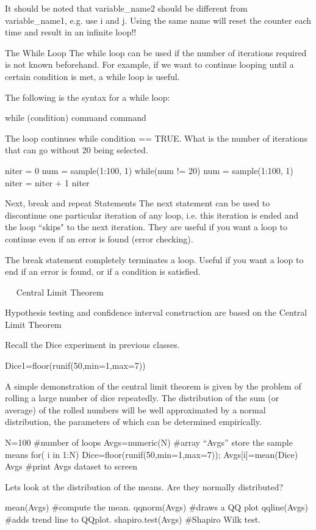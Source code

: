 It should be noted that variable_name2 should be different from
variable_name1, e.g. use i and j. Using the same name will
reset the counter each time and result in an infinite loop!!





The While Loop
The while loop can be used if the number of iterations required is not known beforehand. For example, if we want to continue looping until a certain condition is met, a while loop is useful.

The following is the syntax for a while loop:

while (condition){
command
command
}

The loop continues while condition == TRUE.
What is the number of iterations that can go without 20 being selected.

niter = 0		
num = sample(1:100, 1)
while(num != 20) 
   {
    num = sample(1:100, 1)
    niter = niter + 1
   }
niter

Next, break and repeat Statements
The next statement can be used to discontinue one particular iteration of any loop, i.e. this iteration is ended and the loop “skips" to the next iteration. They are useful if you want a loop to continue even if an error is found (error checking).

The break statement completely terminates a loop. Useful if you want a loop to end if an error is found, or if a condition is satisfied.




 
Central Limit Theorem

Hypothesis testing and confidence interval construction are based on the Central Limit Theorem

Recall the Dice experiment in previous classes.

Dice1=floor(runif(50,min=1,max=7))  

A simple demonstration of the central limit theorem is given by the problem of rolling a large number of dice repeatedly. 
The distribution of the sum (or average) of the rolled numbers will be well approximated by a normal distribution, the parameters of which can be determined empirically.
 
N=100            #number of loops
Avgs=numeric(N)  #array “Avgs” store the sample means
for( i in 1:N)
     { 
     Dice=floor(runif(50,min=1,max=7));
     Avgs[i]=mean(Dice)  
}                                 
Avgs            #print Avgs dataset to screen

Lets look at the distribution of the means. Are they normally distributed?

mean(Avgs)          #compute the mean. 
qqnorm(Avgs)        #draws a QQ plot
qqline(Avgs)        #adds trend line to QQplot.
shapiro.test(Avgs)  #Shapiro Wilk test. 

